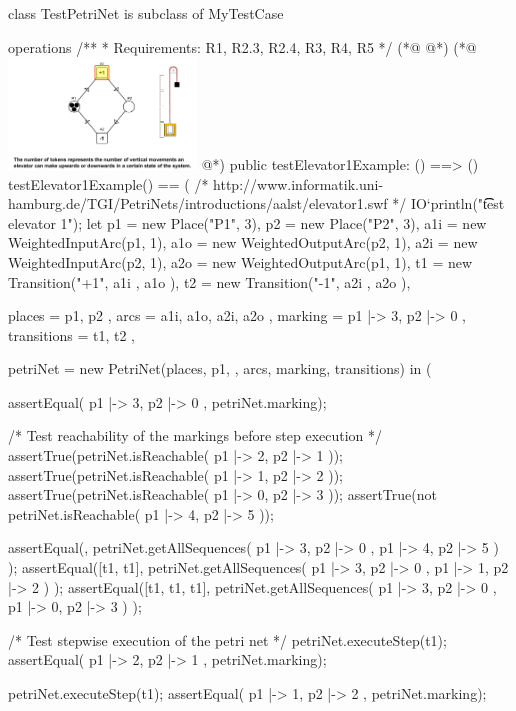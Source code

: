 \begin{vdmpp}
class TestPetriNet is subclass of MyTestCase

operations
  /**
   * Requirements: R1, R2.3, R2.4, R3, R4, R5
   */
(*@
\label{testElevator1Example:4}
@*)
(*@
\includegraphics[width=5cm]{specification/elevator1.png}
@*)
  public testElevator1Example: () ==> ()
  testElevator1Example() == (
    /* http://www.informatik.uni-hamburg.de/TGI/PetriNets/introductions/aalst/elevator1.swf */
    IO`println("\t\t test elevator 1");
    let p1 = new Place("P1", 3),
     p2 = new Place("P2", 3),
     a1i = new WeightedInputArc(p1, 1),
     a1o = new WeightedOutputArc(p2, 1),
     a2i = new WeightedInputArc(p2, 1),
     a2o = new WeightedOutputArc(p1, 1),
     t1 = new Transition("+1", { a1i }, { a1o }),
     t2 = new Transition("-1", { a2i }, { a2o }),

     places = { p1, p2 },
     arcs = { a1i, a1o, a2i, a2o },
     marking = { p1 |-> 3, p2 |-> 0 },
     transitions = { t1, t2 },

     petriNet = new PetriNet(places, p1, {}, arcs, marking, transitions) in (

      assertEqual({ p1 |-> 3, p2 |-> 0 }, petriNet.marking);

      /* Test reachability of the markings before step execution */
      assertTrue(petriNet.isReachable({ p1 |-> 2, p2 |-> 1 }));
      assertTrue(petriNet.isReachable({ p1 |-> 1, p2 |-> 2 }));
      assertTrue(petriNet.isReachable({ p1 |-> 0, p2 |-> 3 }));
      assertTrue(not petriNet.isReachable({ p1 |-> 4, p2 |-> 5 }));

      assertEqual({}, petriNet.getAllSequences(
        { p1 |-> 3, p2 |-> 0 },{ p1 |-> 4, p2 |-> 5 })
      );
      assertEqual({[t1, t1]}, petriNet.getAllSequences(
        { p1 |-> 3, p2 |-> 0 }, { p1 |-> 1, p2 |-> 2 })
      );
      assertEqual({[t1, t1, t1]}, petriNet.getAllSequences(
        { p1 |-> 3, p2 |-> 0 }, { p1 |-> 0, p2 |-> 3 })
      );

      /* Test stepwise execution of the petri net */
      petriNet.executeStep(t1);
      assertEqual({ p1 |-> 2, p2 |-> 1 }, petriNet.marking);

      petriNet.executeStep(t1);
      assertEqual({ p1 |-> 1, p2 |-> 2 }, petriNet.marking);


\end{vdmpp}
